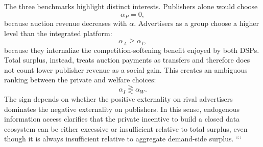 \documentclass[11pt]{article}
\theoremstyle{plain}
\theoremstyle{definition}
\theoremstyle{plain}
\theoremstyle{plain}
\theoremstyle{plain}
\theoremstyle{plain}
\numberwithin{equation}{section}
\begin{document}
The three benchmarks highlight distinct interests. Publishers alone would choose
\[
\alpha_P=0,
\]
because auction revenue decreases with $\alpha$. Advertisers as a group choose a higher level
than the integrated platform:
\[
\alpha_A\ge \alpha_I,
\]
because they internalize the competition-softening benefit enjoyed by both DSPs. Total surplus,
instead, treats auction payments as transfers and therefore does not count lower publisher
revenue as a social gain. This creates an ambiguous ranking between the private and welfare
choices:
\[
\alpha_I\gtreqless \alpha_W.
\]
The sign depends on whether the positive externality on rival advertisers dominates the negative
externality on publishers. In this sense, endogenous information access clarifies that the private
incentive to build a closed data ecosystem can be either excessive or insufficient relative to total
surplus, even though it is always insufficient relative to aggregate demand-side surplus.
```
 
\end{document}
